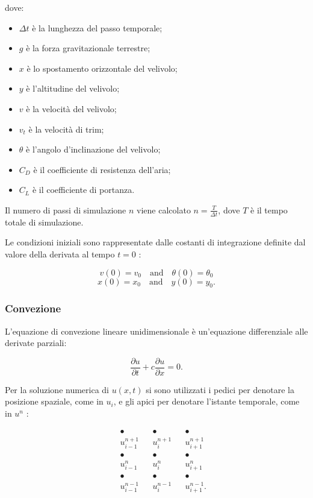 \noindent
dove:
\begin{itemize}
\item $\Delta t$ è la lunghezza del passo temporale;
\item $g$ è la forza gravitazionale terrestre;
\item $x$ è lo spostamento orizzontale del velivolo;
\item $y$ è l'altitudine del velivolo;
\item $v$ è la velocità del velivolo;
\item $v_t$ è la velocità di trim;
\item $\theta$ è l'angolo d'inclinazione del velivolo;
\item $C_D$ è il coefficiente di resistenza dell'aria;
\item $C_L$ è il coefficiente di portanza.
\end{itemize}

\noindent
Il numero di passi di simulazione $n$ viene calcolato $n = \frac{T}{\Delta t}$, dove $T$ è il
tempo totale di simulazione.

\noindent
Le condizioni iniziali sono rappresentate dalle costanti di integrazione definite dal valore della derivata al tempo $t = 0$ :

$$
v(0) = v_0 \quad \text{and} \quad \theta(0) = \theta_0
$$
$$
x(0) = x_0 \quad \text{and} \quad y(0) = y_0.
$$

\subsubsection*{Convezione}
L’equazione di convezione lineare unidimensionale è un’equazione differenziale alle derivate parziali: 

\begin{equation}
\frac{\partial u}{\partial t} + c \frac{\partial u}{\partial x} = 0.
\end{equation}

\noindent
Per la soluzione numerica di $u(x,t)$ si sono utilizzati i pedici per denotare la posizione spaziale, come in $u_i$, e gli apici per denotare l’istante temporale, come in $u^n$ : 

$$
\begin{matrix}
& &\bullet & & \bullet & &  \bullet \\
& &u^{n+1}_{i-1} & & u^{n+1}_i & & u^{n+1}_{i+1} \\
& &\bullet & & \bullet & &  \bullet \\
& &u^n_{i-1} & & u^n_i & & u^n_{i+1} \\
& &\bullet & & \bullet & &  \bullet \\
& &u^{n-1}_{i-1} & & u^{n-1}_i & & u^{n-1}_{i+1}. \\
\end{matrix}
$$

